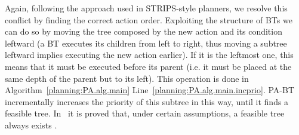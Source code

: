 
Again, following the approach used in STRIPS-style planners, we resolve this conflict by finding the correct action order. Exploiting the structure of BTs we can do so by moving the tree composed by the new action and its condition leftward (a BT executes its children from left to right, thus moving a subtree leftward implies executing the new action earlier). If it is the leftmost one, this means that it must be executed before its parent (i.e. it must be placed at the same depth of the parent but to its left). This operation is done in Algorithm~\ref{planning:PA.alg.main}  Line~\ref{planning:PA.alg.main.incprio}. PA-BT incrementally increases the priority of this subtree in this way, until it finds a feasible tree. In~\cite{colledanchise2016towards} it is proved that, under certain assumptions, a feasible tree always exists .





